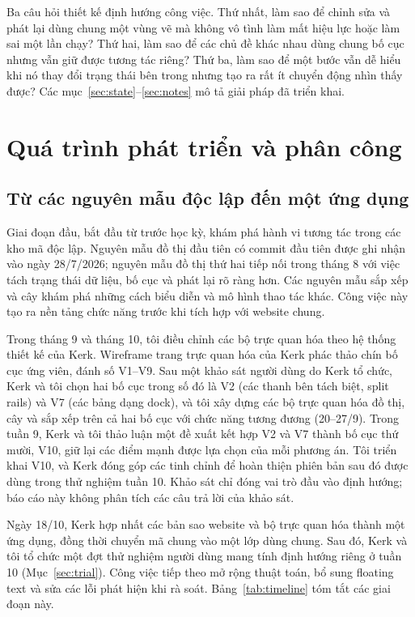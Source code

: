 \documentclass[11pt,a4paper]{article}
\begin{document}
Ba câu hỏi thiết kế định hướng công việc. Thứ nhất, làm sao để chỉnh sửa và phát lại dùng chung một vùng vẽ mà không vô tình làm mất hiệu lực hoặc làm sai một lần chạy? Thứ hai, làm sao để các chủ đề khác nhau dùng chung bố cục nhưng vẫn giữ được tương tác riêng? Thứ ba, làm sao để một bước vẫn dễ hiểu khi nó thay đổi trạng thái bên trong nhưng tạo ra rất ít chuyển động nhìn thấy được? Các mục~\ref{sec:state}--\ref{sec:notes} mô tả giải pháp đã triển khai.

\nextsection
\section{Quá trình phát triển và phân công}\label{sec:approach}
\subsection{Từ các nguyên mẫu độc lập đến một ứng dụng}
Giai đoạn đầu, bắt đầu từ trước học kỳ, khám phá hành vi tương tác trong các kho mã độc lập. Nguyên mẫu đồ thị đầu tiên có commit đầu tiên được ghi nhận vào ngày 28/7/2026; nguyên mẫu đồ thị thứ hai tiếp nối trong tháng 8 với việc tách trạng thái dữ liệu, bố cục và phát lại rõ ràng hơn. Các nguyên mẫu sắp xếp và cây khám phá những cách biểu diễn và mô hình thao tác khác. Công việc này tạo ra nền tảng chức năng trước khi tích hợp với website chung.

Trong tháng 9 và tháng 10, tôi điều chỉnh các bộ trực quan hóa theo hệ thống thiết kế của Kerk. Wireframe trang trực quan hóa của Kerk phác thảo chín bố cục ứng viên, đánh số V1--V9. Sau một khảo sát người dùng do Kerk tổ chức, Kerk và tôi chọn hai bố cục trong số đó là V2 (các thanh bên tách biệt, split rails) và V7 (các bảng dạng dock), và tôi xây dựng các bộ trực quan hóa đồ thị, cây và sắp xếp trên cả hai bố cục với chức năng tương đương (20--27/9). Trong tuần 9, Kerk và tôi thảo luận một đề xuất kết hợp V2 và V7 thành bố cục thứ mười, V10, giữ lại các điểm mạnh được lựa chọn của mỗi phương án. Tôi triển khai V10, và Kerk đóng góp các tinh chỉnh để hoàn thiện phiên bản sau đó được dùng trong thử nghiệm tuần 10. Khảo sát chỉ đóng vai trò đầu vào định hướng; báo cáo này không phân tích các câu trả lời của khảo sát.

Ngày 18/10, Kerk hợp nhất các bản sao website và bộ trực quan hóa thành một ứng dụng, đồng thời chuyển mã chung vào một lớp dùng chung. Sau đó, Kerk và tôi tổ chức một đợt thử nghiệm người dùng mang tính định hướng riêng ở tuần 10 (Mục~\ref{sec:trial}). Công việc tiếp theo mở rộng thuật toán, bổ sung floating text và sửa các lỗi phát hiện khi rà soát. Bảng~\ref{tab:timeline} tóm tắt các giai đoạn này.
\end{document}
